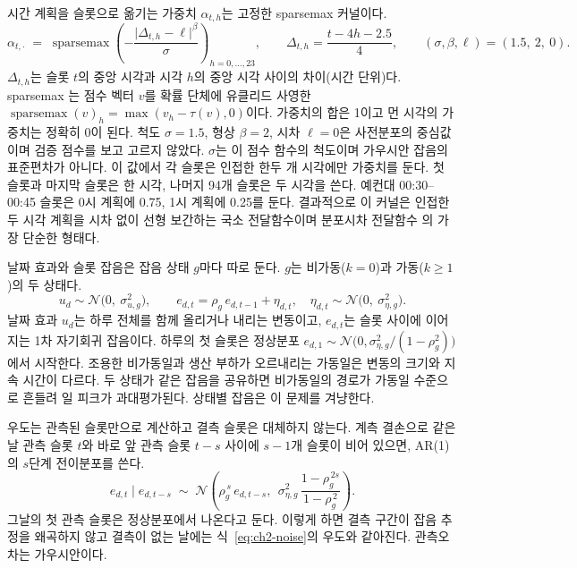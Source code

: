 시간 계획을 슬롯으로 옮기는 가중치 $\alpha_{t,h}$는 고정한 sparsemax 커널이다.
\begin{equation}
\alpha_{t,\cdot} \;=\; \operatorname{sparsemax}\!\left(-\frac{\lvert \Delta_{t,h} - \ell\rvert^{\beta}}{\sigma}\right)_{h=0,\dots,23},
\qquad \Delta_{t,h}=\frac{t-4h-2.5}{4},
\qquad (\sigma,\beta,\ell)=(1.5,\ 2,\ 0).
\label{eq:ch2-kernel}
\end{equation}
$\Delta_{t,h}$는 슬롯 $t$의 중앙 시각과 시각 $h$의 중앙 시각 사이의 차이(시간 단위)다. sparsemax \citep{martins2016sparsemax}는 점수 벡터 $v$를 확률 단체에 유클리드 사영한 $\operatorname{sparsemax}(v)_h=\max(v_h-\tau(v),0)$이다. 가중치의 합은 1이고 먼 시각의 가중치는 정확히 0이 된다. 척도 $\sigma=1.5$, 형상 $\beta=2$, 시차 $\ell=0$은 사전분포의 중심값이며 검증 점수를 보고 고르지 않았다. $\sigma$는 이 점수 함수의 척도이며 가우시안 잡음의 표준편차가 아니다. 이 값에서 각 슬롯은 인접한 한두 개 시각에만 가중치를 둔다. 첫 슬롯과 마지막 슬롯은 한 시각, 나머지 94개 슬롯은 두 시각을 쓴다. 예컨대 00:30--00:45 슬롯은 0시 계획에 0.75, 1시 계획에 0.25를 둔다. 결과적으로 이 커널은 인접한 두 시각 계획을 시차 없이 선형 보간하는 국소 전달함수이며 분포시차 전달함수 \citep{welty2009bdlm}의 가장 단순한 형태다.

날짜 효과와 슬롯 잡음은 잡음 상태 $g$마다 따로 둔다. $g$는 비가동($k=0$)과 가동($k\ge1$)의 두 상태다.
\begin{equation}
u_d \sim \mathcal N\!\big(0,\ \sigma^2_{u,g}\big),
\qquad
e_{d,t} = \rho_g\, e_{d,t-1} + \eta_{d,t},\quad \eta_{d,t}\sim \mathcal N\!\big(0,\ \sigma^2_{\eta,g}\big).
\label{eq:ch2-noise}
\end{equation}
날짜 효과 $u_d$는 하루 전체를 함께 올리거나 내리는 변동이고, $e_{d,t}$는 슬롯 사이에 이어지는 1차 자기회귀 잡음이다. 하루의 첫 슬롯은 정상분포 $e_{d,1}\sim\mathcal N\big(0,\sigma^2_{\eta,g}/(1-\rho_g^2)\big)$에서 시작한다. 조용한 비가동일과 생산 부하가 오르내리는 가동일은 변동의 크기와 지속 시간이 다르다. 두 상태가 같은 잡음을 공유하면 비가동일의 경로가 가동일 수준으로 흔들려 일 피크가 과대평가된다. 상태별 잡음은 이 문제를 겨냥한다.

우도는 관측된 슬롯만으로 계산하고 결측 슬롯은 대체하지 않는다. 계측 결손으로 같은 날 관측 슬롯 $t$와 바로 앞 관측 슬롯 $t-s$ 사이에 $s-1$개 슬롯이 비어 있으면, AR(1)의 $s$단계 전이분포를 쓴다.
\begin{equation}
e_{d,t} \mid e_{d,t-s} \;\sim\; \mathcal N\!\left(\rho_g^{\,s}\, e_{d,t-s},\ \ \sigma^2_{\eta,g}\,\frac{1-\rho_g^{\,2s}}{1-\rho_g^{\,2}}\right).
\label{eq:ch2-gap}
\end{equation}
그날의 첫 관측 슬롯은 정상분포에서 나온다고 둔다. 이렇게 하면 결측 구간이 잡음 추정을 왜곡하지 않고 결측이 없는 날에는 식~\eqref{eq:ch2-noise}의 우도와 같아진다. 관측오차는 가우시안이다.


